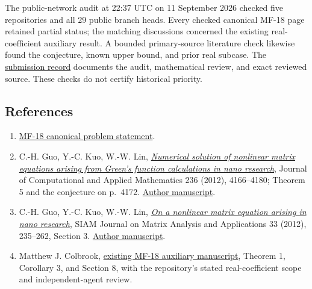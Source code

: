 \documentclass[10pt,a4paper]{article}
\providecommand{\tightlist}{\setlength{\itemsep}{0pt}\setlength{\parskip}{0pt}}
\begin{document}
The public-network audit at 22:37 UTC on 11 September 2026 checked five
repositories and all 29 public branch heads. Every checked canonical
MF-18 page retained partial status; the matching discussions concerned
the existing real-coefficient auxiliary result. A bounded primary-source
literature check likewise found the conjecture, known upper bound, and
prior real subcase. The
\href{https://github.com/ajt60gaibb/OpenProblemsInNLA/blob/main/references/stepaniants-mf18-2026-09-11/README.md}{submission
record} documents the audit, mathematical review, and exact reviewed
source. These checks do not certify historical priority.

\subsection{References}\label{references}

\begin{enumerate}
\def\labelenumi{\arabic{enumi}.}
\tightlist
\item
  \href{https://github.com/ajt60gaibb/OpenProblemsInNLA/blob/aaa88c4/matrix-functions-and-stability/MF-18/README.md}{MF-18
  canonical problem statement}.
\item
  C.-H. Guo, Y.-C. Kuo, W.-W. Lin,
  \href{https://doi.org/10.1016/j.cam.2012.05.012}{\emph{Numerical
  solution of nonlinear matrix equations arising from Green's function
  calculations in nano research}}, Journal of Computational and Applied
  Mathematics 236 (2012), 4166--4180; Theorem 5 and the conjecture on
  p.~4172. \href{https://uregina.ca/~chguo/JCAM_GuoKuoLin.pdf}{Author
  manuscript}.
\item
  C.-H. Guo, Y.-C. Kuo, W.-W. Lin,
  \href{https://doi.org/10.1137/100814706}{\emph{On a nonlinear matrix
  equation arising in nano research}}, SIAM Journal on Matrix Analysis
  and Applications 33 (2012), 235--262, Section 3.
  \href{https://uregina.ca/~chguo/simax81470.pdf}{Author manuscript}.
\item
  Matthew J. Colbrook,
  \href{https://github.com/ajt60gaibb/OpenProblemsInNLA/blob/aaa88c4/references/colbrook-matrix-functions-2026-09-11/manuscripts/MF-18.tex}{existing
  MF-18 auxiliary manuscript}, Theorem 1, Corollary 3, and Section 8,
  with the repository's stated real-coefficient scope and
  independent-agent review.
\end{enumerate}
\end{document}
